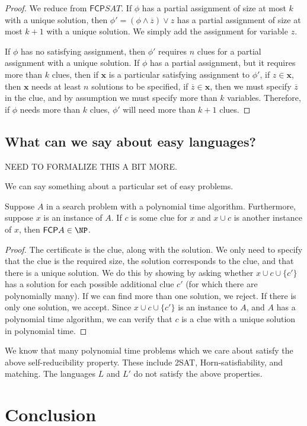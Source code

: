 \documentclass[runningheads,a4paper]{llncs}
\begin{document}
\begin{proof}
We reduce from $\mathsf{FCP} SAT$. If $\phi$ has a partial assignment of size at most $k$ with a unique solution, then $\phi' = (\phi \wedge \overline{z}) \vee z$ has a partial assignment of size at most $k+1$ with a unique solution. We simply add the assignment for variable $z$. 

If $\phi$ has no satisfying assignment, then $\phi'$ requires $n$ clues for a partial assignment with a unique solution. If $\phi$ has a partial assignment, but it requires more than $k$ clues, then if $\textbf{x}$ is a particular satisfying assignment to $\phi'$, if $z  \in \textbf{x}$, then $\textbf{x}$ needs at least $n$ solutions to be specified, if $\overline{z} \in \textbf{x}$, then we must specify $\overline{z}$ in the clue, and by assumption we must specify more than $k$ variables. Therefore, if $\phi$ needs more than $k$ clues, $\phi'$ will need more than $k+1$ clues. 
\end{proof}

\subsection{What can we say about easy languages?}

NEED TO FORMALIZE THIS A BIT MORE.

We can say something about a particular set of easy problems. 
\begin{proposition}
Suppose $A$ in a search problem with a polynomial time algorithm. Furthermore, suppose $x$ is an instance of $A$. If $c$ is some clue for $x$ and $x \cup c$ is another instance of $x$, then $\mathsf{FCP} A \in \NP$. 
\end{proposition}

\begin{proof}
The certificate is the clue, along with the solution. We only need to specify that the clue is the required size, the solution corresponds to the clue, and that there is a unique solution. We do this by showing by asking whether $x \cup c \cup \{ c' \}$ has a solution for each possible additional clue $c'$ (for which there are polynomially many). If we can find more than one solution, we reject. If there is only one solution, we accept. Since $x \cup c \cup \{ c' \}$ is an instance to $A$, and $A$ has a polynomial time algorithm, we can verify that $c$ is a clue with a unique solution in polynomial time.
\end{proof}

We know that many polynomial time problems which we care about satisfy the above self-reducibility property. These include 2SAT, Horn-satisfiability, and matching. The languages $L$ and $L'$ do not satisfy the above properties.

\section{Conclusion}
\label{sec:conclusion}




\end{document}
